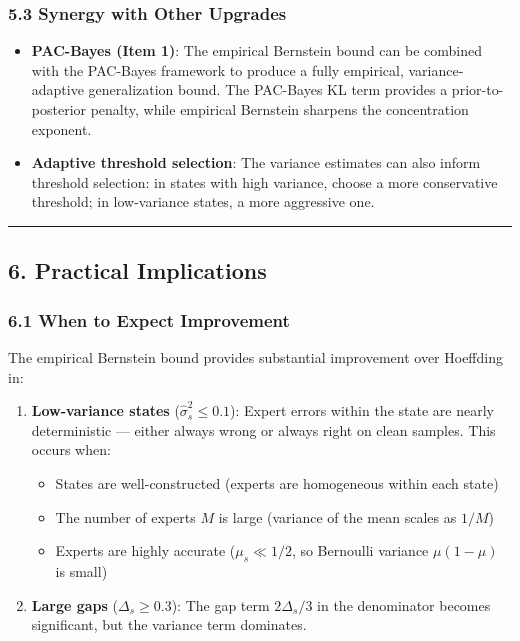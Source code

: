 \documentclass[
  12pt,
]{ctexart}
\providecommand{\tightlist}{%
  \setlength{\itemsep}{0pt}\setlength{\parskip}{0pt}}
\begin{document}
\subsubsection{5.3 Synergy with Other
Upgrades}\label{synergy-with-other-upgrades}

\begin{itemize}
\item
  \textbf{PAC-Bayes (Item 1)}: The empirical Bernstein bound can be
  combined with the PAC-Bayes framework to produce a fully empirical,
  variance-adaptive generalization bound. The PAC-Bayes KL term provides
  a prior-to-posterior penalty, while empirical Bernstein sharpens the
  concentration exponent.
\item
  \textbf{Adaptive threshold selection}: The variance estimates can also
  inform threshold selection: in states with high variance, choose a
  more conservative threshold; in low-variance states, a more aggressive
  one.
\end{itemize}

\begin{center}\rule{0.5\linewidth}{0.5pt}\end{center}

\subsection{6. Practical Implications}\label{practical-implications}

\subsubsection{6.1 When to Expect
Improvement}\label{when-to-expect-improvement}

The empirical Bernstein bound provides substantial improvement over
Hoeffding in:

\begin{enumerate}
\def\labelenumi{\arabic{enumi}.}
\tightlist
\item
  \textbf{Low-variance states} (\(\hat{\sigma}_s^2 \leq 0.1\)): Expert
  errors within the state are nearly deterministic --- either always
  wrong or always right on clean samples. This occurs when:

  \begin{itemize}
  \tightlist
  \item
    States are well-constructed (experts are homogeneous within each
    state)
  \item
    The number of experts \(M\) is large (variance of the mean scales as
    \(1/M\))
  \item
    Experts are highly accurate (\(\mu_s \ll 1/2\), so Bernoulli
    variance \(\mu(1-\mu)\) is small)
  \end{itemize}
\item
  \textbf{Large gaps} (\(\Delta_s \geq 0.3\)): The gap term
  \(2\Delta_s/3\) in the denominator becomes significant, but the
  variance term dominates.
\end{enumerate}
\end{document}
